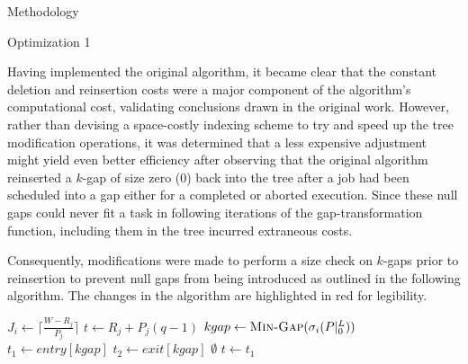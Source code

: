 \documentclass{article}
\begin{document}
\begin{section}{Methodology}
  \begin{subsection}{Optimization 1}
    \begin{paragraph}{}
      Having implemented the original algorithm, it became clear that the constant
      deletion and reinsertion costs were a major component of the algorithm's
      computational cost, validating conclusions drawn in the original work\autocite[17]{BelwalCheng}. However, rather than devising a space-costly indexing scheme to try and speed
      up the tree modification operations, it was determined that a less expensive
      adjustment might yield even better efficiency after observing that the original
      algorithm reinserted a $k$-gap of size zero (0) back into the tree after a job
      had been scheduled into a gap either for a completed or aborted execution.
      Since these null gaps could never fit a task in following iterations of the
      gap-transformation function, including them in the tree incurred extraneous costs.
    \end{paragraph}
    \begin{paragraph}{}
      Consequently, modifications were made to perform a size check
      on $k$-gaps prior to reinsertion to prevent null gaps from being introduced
      as outlined in the following algorithm. The changes in the algorithm are
      highlighted in red for legibility.
    \begin{algorithm}[H]
      \caption{Gap-Tranformation Algorithm Optimization 1: No Zero Gaps Reinserted}\label{gapxfrm2}
      \begin{algorithmic}[2]
          \State $J_{i} \gets \lceil\frac{W - R_{j}}{P_{j}}\rceil$
            \State $t \gets R_{j} + P_{j}(q-1)$
            \State $kgap \gets \Call{Min-Gap}{\sigma_{i}(P|_{0}^{L})}$
            \State $t_{1} \gets entry[kgap]$
            \State $t_{2} \gets exit[kgap]$
                \State \Return $\emptyset$
              \EndIf
                \State $t \gets t_{1}$
              \EndIf
                \State \Call{Gap-Delete}{$\sigma_{i}(P|_{0}^{L}), [t_{1},t_{2})$}
                    \State \Call{Gap-Insert}{$\sigma_{i}(P|_{0}^{L}), [t_{1},t)$}
                  \NewEndIf

\end{algorithmic}
\end{algorithm}
\end{paragraph}
\end{subsection}
\end{section}
\end{document}
